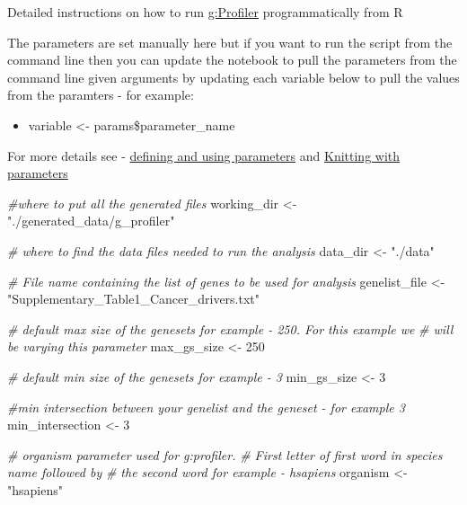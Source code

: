 \documentclass[
]{book}
\newenvironment{Shaded}{\begin{snugshade}}{\end{snugshade}}
\newcommand{\CommentTok}[1]{\textcolor[rgb]{0.56,0.35,0.01}{\textit{#1}}}
\newcommand{\DecValTok}[1]{\textcolor[rgb]{0.00,0.00,0.81}{#1}}
\newcommand{\NormalTok}[1]{#1}
\newcommand{\OtherTok}[1]{\textcolor[rgb]{0.56,0.35,0.01}{#1}}
\newcommand{\StringTok}[1]{\textcolor[rgb]{0.31,0.60,0.02}{#1}}
\providecommand{\tightlist}{%
  \setlength{\itemsep}{0pt}\setlength{\parskip}{0pt}}
\begin{document}
Detailed instructions on how to run \href{https://biit.cs.ut.ee/gprofiler/gost}{g:Profiler} programmatically from R

The parameters are set manually here but if you want to run the script from the command line then you can update the notebook to pull the parameters from the command line given arguments by updating each variable below to pull the values from the paramters - for example:

\begin{itemize}
\tightlist
\item
  variable \textless- params\$parameter\_name
\end{itemize}

For more details see - \href{https://bookdown.org/yihui/rmarkdown/params-declare.html}{defining and using parameters} and \href{https://bookdown.org/yihui/rmarkdown/params-knit.html}{Knitting with parameters}

\begin{Shaded}
\begin{Highlighting}[]
\CommentTok{\#where to put all the generated files}
\NormalTok{working\_dir }\OtherTok{\textless{}{-}} \StringTok{"./generated\_data/g\_profiler"}

\CommentTok{\# where to find the data files needed to run the analysis}
\NormalTok{data\_dir }\OtherTok{\textless{}{-}}  \StringTok{"./data"}

\CommentTok{\# File name containing the list of genes to be used for analysis}
\NormalTok{genelist\_file }\OtherTok{\textless{}{-}} \StringTok{"Supplementary\_Table1\_Cancer\_drivers.txt"}

\CommentTok{\# default max size of the genesets for example {-}  250.  For this example we}
\CommentTok{\# will be varying this parameter}
\NormalTok{max\_gs\_size }\OtherTok{\textless{}{-}} \DecValTok{250}

\CommentTok{\# default min size of the genesets for example {-}  3}
\NormalTok{min\_gs\_size }\OtherTok{\textless{}{-}} \DecValTok{3}

\CommentTok{\#min intersection between your genelist and the geneset {-} for example 3}
\NormalTok{min\_intersection }\OtherTok{\textless{}{-}} \DecValTok{3}

\CommentTok{\# organism parameter used for g:profiler.  }
\CommentTok{\# First letter of first word in species name followed by }
\CommentTok{\# the second word for example {-} hsapiens}
\NormalTok{organism }\OtherTok{\textless{}{-}} \StringTok{"hsapiens"}
\end{Highlighting}
\end{Shaded}
\end{document}
